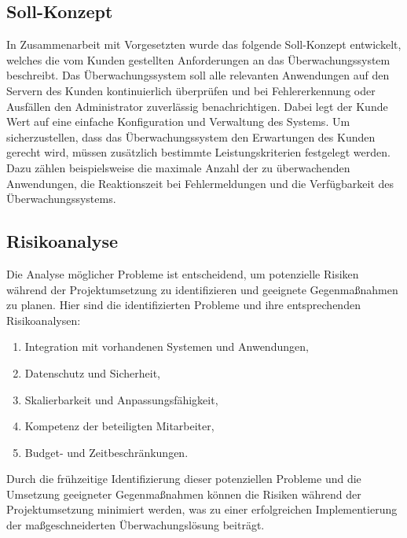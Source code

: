 \begin{flushleft}
	\subsection{Soll-Konzept}
	In Zusammenarbeit mit Vorgesetzten wurde das folgende Soll-Konzept entwickelt, welches die vom Kunden gestellten Anforderungen an das Überwachungssystem beschreibt.
	Das Überwachungssystem soll alle relevanten Anwendungen auf den Servern des Kunden kontinuierlich überprüfen und bei Fehlererkennung oder Ausfällen den Administrator zuverlässig benachrichtigen. Dabei legt der Kunde Wert auf eine einfache Konfiguration und Verwaltung des Systems.
	Um sicherzustellen, dass das Überwachungssystem den Erwartungen des Kunden gerecht wird, müssen zusätzlich bestimmte Leistungskriterien festgelegt werden. Dazu zählen beispielsweise die maximale Anzahl der zu überwachenden Anwendungen, die Reaktionszeit bei Fehlermeldungen und die Verfügbarkeit des Überwachungssystems.

	\subsection{Risikoanalyse}

Die Analyse möglicher Probleme ist entscheidend, um potenzielle Risiken während der Projektumsetzung zu identifizieren und geeignete Gegenmaßnahmen zu planen. Hier sind die identifizierten Probleme und ihre entsprechenden Risikoanalysen:
	\begin{enumerate}
	\item Integration mit vorhandenen Systemen und Anwendungen,
	\item Datenschutz und Sicherheit,
	\item Skalierbarkeit und Anpassungsfähigkeit,
	\item Kompetenz der beteiligten Mitarbeiter,
	\item Budget- und Zeitbeschränkungen.
	\end{enumerate}
	Durch die frühzeitige Identifizierung dieser potenziellen Probleme und die Umsetzung geeigneter Gegenmaßnahmen können die Risiken während der Projektumsetzung minimiert werden, was zu einer erfolgreichen Implementierung der maßgeschneiderten Überwachungslösung beiträgt.

\end{flushleft}
